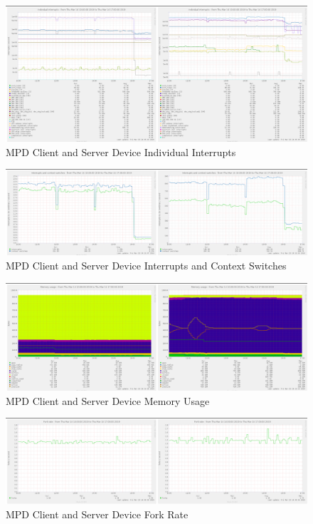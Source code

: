 \documentclass[11pt,a4paper,headinclude=false,footinclude=false]{scrreprt}
\begin{document}
\begin{figure}[H]
\includegraphics{ResultsAndAnalysis/MPDServerTestImages/013MPDIndividualInterrupts.png}
\centering
\caption{MPD Client and Server Device Individual Interrupts}
\label{MPDIndInt}
\end{figure}

\begin{figure}[H]
\includegraphics{ResultsAndAnalysis/MPDServerTestImages/014MPDInterruptsAndContextSwitches.png}
\centering
\caption{MPD Client and Server Device Interrupts and Context Switches}
\label{MPDIntCont}
\end{figure}

\begin{figure}[H]
\includegraphics{ResultsAndAnalysis/MPDServerTestImages/016MPDMemoryUsage.png}
\centering
\caption{MPD Client and Server Device Memory Usage}
\label{MPDMemUse}
\end{figure}

\begin{figure}[H]
\includegraphics{ResultsAndAnalysis/MPDServerTestImages/012MPDForkRate.png}
\centering
\caption{MPD Client and Server Device Fork Rate}
\label{MPDForkRate}
\end{figure}
\end{document}
